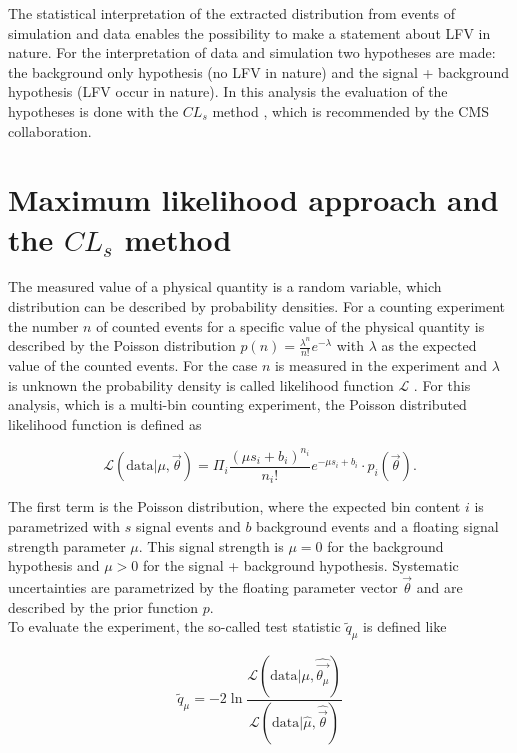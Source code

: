 The statistical interpretation of the extracted distribution from events of simulation and data enables the possibility to make a statement about \gls{LFV} in nature. For the interpretation of data and simulation two hypotheses are made: the background only hypothesis (no \gls{LFV} in nature) and the signal + background hypothesis (\gls{LFV} occur in nature). In this analysis the evaluation of the hypotheses  is done with the $CL_s$ method \cite{CLS}, which is recommended by the \gls{CMS} collaboration. 

\section{Maximum likelihood approach and the $CL_s$ method}
\label{sec:section_5_1}

The measured value of a physical quantity is a random variable, which distribution can be described by probability densities. For a counting experiment the number $n$ of counted events for a specific value of the physical quantity is described by the Poisson distribution $p(n) = \frac{\lambda^{n}}{n!}e^{-\lambda}$ with $\lambda$ as the expected value of the counted events. For the case $n$ is measured in the experiment and $\lambda$ is unknown the probability density is called likelihood function $\mathcal{L}$ \cite{LIKELIHOOD}. For this analysis, which is a multi-bin counting experiment, the Poisson distributed likelihood function is defined as

\begin{equation}
	\label{eq:eq_5_1}
	\mathcal{L}(\text{data} | \mu, \vec{\theta}) = \Pi_{i} \frac{(\mu s_i+ b_i)^{n_i}}{n_i!} e^{-\mu s_i +b_i} \cdot p_i(\vec{\theta}).
\end{equation}

The first term is the Poisson distribution, where the expected bin content $i$ is parametrized with $s$ signal events and $b$ background events and a floating signal strength parameter $\mu$. This signal strength is $\mu = 0$ for the background hypothesis and $\mu>0$ for the signal + background hypothesis. Systematic uncertainties are parametrized by the floating parameter vector $\vec{\theta}$ and are described by the prior function $p$.  \\

To evaluate the experiment, the so-called test statistic $\tilde{q}_{\mu}$ is defined like 

\begin{equation}
	\label{eq:eq_5_2}
	\tilde{q}_{\mu} = -2\ln{\frac{\mathcal{L}(\text{data} | \mu, \hat{\vec{\theta_{\mu}}})}{\mathcal{L}(\text{data} | \hat{\mu}, \hat{\vec{\theta}})}}
\end{equation}

